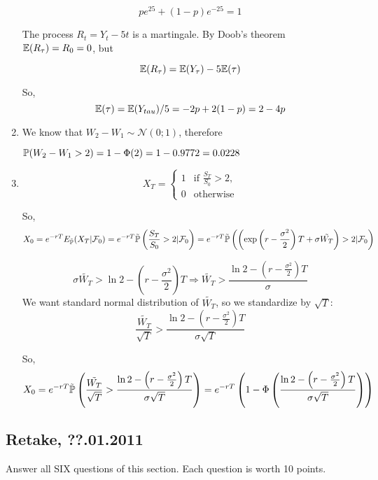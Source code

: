 \documentclass[12pt, a4paper]{article}
\newcommand{\cF}{\mathcal{F}}
\newcommand{\cN}{\mathcal{N}}
\begin{document}
\begin{enumerate}
\[
p e^{25} + (1-p) e^{-25} = 1
\]

The process $R_t = Y_t - 5t$ is a martingale. By Doob's theorem $\E(R_{\tau}) = R_0 = 0$, but

\[
\E(R_{\tau}) = \E(Y_{\tau}) - 5\E(\tau)
\]

So,
\[
\E(\tau) = \E(Y_{tau}) / 5 = -2p + 2(1-p)=2-4p
\]


\item We know that $W_{2}-W_{1}\sim \cN(0; 1)$, therefore

$\P(W_{2}-W_{1}> 2)=1-\Phi(2)=1-0.9772=0.0228$


\item

\[
 X_{T}=
 \begin{cases}
  1 & \text{if } \frac{S_{T}}{S_{0}}>2, \\
  0 & \text{otherwise}
 \end{cases}
\]

So,
\[
X_{0}=e^{-rT}E_{\tilde{\P}}(X_{T}|\cF_{0})=e^{-rT}\tilde{\P}\left(\frac{S_{T}}{S_{0}}>2 |\cF_{0}\right)=e^{-rT}\tilde{\P}\left(\left(\exp\left(r-\frac{\sigma^{2}}{2}\right)T+\sigma\tilde{W_{T}}\right)>2|\cF_{0}\right)
\]

\[
 \sigma\tilde{W_{T}}>\ln 2-\left(r-\frac{\sigma^{2}}{2}\right)T \Rightarrow \tilde{W_{T}}>\frac{\ln 2-\left(r-\frac{\sigma^{2}}{2}\right)T}{\sigma}
\]
We want standard normal distribution of $\tilde{W_{T}}$, so we standardize by $\sqrt{T}$:
\[
 \frac{\tilde{W_{T}}}{\sqrt{T}}>\frac{\ln 2-\left(r-\frac{\sigma^{2}}{2}\right)T}{\sigma \sqrt{T}}
\]

So,
\[
 X_{0}=e^{-rT}\tilde{\P}\left( \frac{\tilde{W_{T}}}{\sqrt{T}}>\frac{\ln 2-\left(r-\frac{\sigma^{2}}{2}\right)T}{\sigma \sqrt{T}}\right)=e^{-rT}\left(1-\Phi\left(\frac{\ln 2-\left(r-\frac{\sigma^{2}}{2}\right)T}{\sigma \sqrt{T}}\right)\right)
\]



\end{enumerate}


\subsection{Retake, ??.01.2011}

Answer all SIX questions of this section. Each question is worth 10 points.
\end{document}
